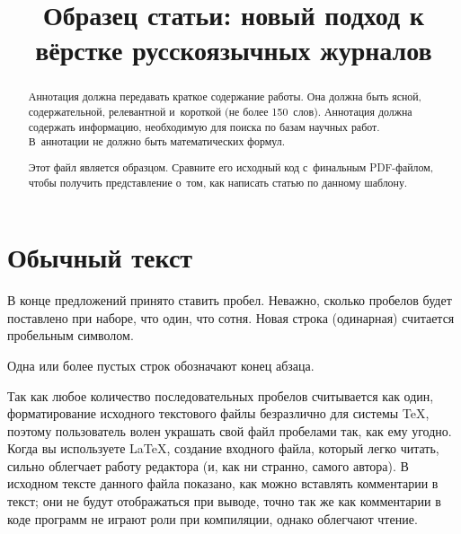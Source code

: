 \documentclass[final,pdftex]{epsilonj}
\numberwithin{equation}{section}
\begin{document}
\begin{frontmatter}
\title{Образец статьи: новый подход к вёрстке русскоязычных журналов}


\begin{aug}
\author{ }%
\author{ }%
\author{ }


\address{Адрес первого и второго автора, как правило, в пару строк}

\address{Адрес третьего автора, как правило, в пару строк}
\end{aug}

\begin{abstract}
Аннотация должна передавать краткое содержание работы.
Она должна быть ясной, содержательной, релевантной и~короткой
(не более 150~слов). Аннотация должна содержать информацию,
необходимую для поиска по базам научных работ. 
В~аннотации не должно быть математических формул.

Этот файл является образцом. Сравните его исходный код
с~финальным PDF-файлом, чтобы получить представление о~том,
как написать статью по данному шаблону.
\end{abstract}

\begin{keyword}
\kwd{\LaTeX}
\end{keyword}

\end{frontmatter}


\section{Обычный текст}

В конце   предложений принято ставить пробел. Неважно, сколько
пробелов будет поставлено при наборе, что один, что сотня.
Новая строка (одинарная) считается пробельным символом.

Одна   или более пустых строк обозначают конец абзаца.

Так как любое количество последовательных пробелов считывается как
один, форматирование исходного текстового файлы безразлично для
системы 
      \TeX,         %
поэтому пользователь волен украшать свой файл пробелами так,
как ему угодно.
Когда вы используете
      \LaTeX,       %
создание входного файла, который легко читать, сильно облегчает
работу редактора (и, как ни странно, самого автора).
В исходном тексте данного файла показано, как можно вставлять комментарии в текст; они не будут отображаться при выводе, точно так же как комментарии в коде программ не играют роли при компиляции, однако облегчают чтение.
\end{document}
